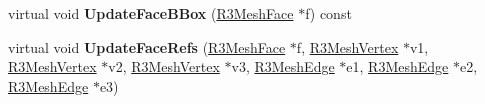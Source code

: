 \begin{DoxyCompactItemize}
\item 
virtual void {\bfseries Update\+Face\+B\+Box} (\hyperlink{class_r3_mesh_face}{R3\+Mesh\+Face} $\ast$f) const \hypertarget{class_r3_mesh_a155bfcdcb316894104f128ce85e05c08}{}\label{class_r3_mesh_a155bfcdcb316894104f128ce85e05c08}

\item 
virtual void {\bfseries Update\+Face\+Refs} (\hyperlink{class_r3_mesh_face}{R3\+Mesh\+Face} $\ast$f, \hyperlink{class_r3_mesh_vertex}{R3\+Mesh\+Vertex} $\ast$v1, \hyperlink{class_r3_mesh_vertex}{R3\+Mesh\+Vertex} $\ast$v2, \hyperlink{class_r3_mesh_vertex}{R3\+Mesh\+Vertex} $\ast$v3, \hyperlink{class_r3_mesh_edge}{R3\+Mesh\+Edge} $\ast$e1, \hyperlink{class_r3_mesh_edge}{R3\+Mesh\+Edge} $\ast$e2, \hyperlink{class_r3_mesh_edge}{R3\+Mesh\+Edge} $\ast$e3)\hypertarget{class_r3_mesh_aa6620960002712f54a15fb61283d24ec}{}\label{class_r3_mesh_aa6620960002712f54a15fb61283d24ec}

\end{DoxyCompactItemize}
